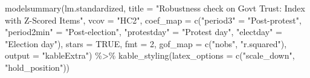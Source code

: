 \documentclass[
  letterpaper,
  DIV=11,
  numbers=noendperiod]{scrartcl}
\newenvironment{Shaded}{\begin{snugshade}}{\end{snugshade}}
\newcommand{\AttributeTok}[1]{\textcolor[rgb]{0.40,0.45,0.13}{#1}}
\newcommand{\ConstantTok}[1]{\textcolor[rgb]{0.56,0.35,0.01}{#1}}
\newcommand{\DecValTok}[1]{\textcolor[rgb]{0.68,0.00,0.00}{#1}}
\newcommand{\FunctionTok}[1]{\textcolor[rgb]{0.28,0.35,0.67}{#1}}
\newcommand{\NormalTok}[1]{\textcolor[rgb]{0.00,0.23,0.31}{#1}}
\newcommand{\OtherTok}[1]{\textcolor[rgb]{0.00,0.23,0.31}{#1}}
\newcommand{\SpecialCharTok}[1]{\textcolor[rgb]{0.37,0.37,0.37}{#1}}
\newcommand{\StringTok}[1]{\textcolor[rgb]{0.13,0.47,0.30}{#1}}
\begin{document}
\begin{Shaded}
\begin{Highlighting}[]
\FunctionTok{modelsummary}\NormalTok{(lm.standardized,}
             \AttributeTok{title =} \StringTok{"Robustness check on Gov\textquotesingle{}t Trust: Index with Z{-}Scored Items"}\NormalTok{,}
             \AttributeTok{vcov =} \StringTok{"HC2"}\NormalTok{,}
             \AttributeTok{coef\_map =} \FunctionTok{c}\NormalTok{(}\StringTok{"period3"} \OtherTok{=} \StringTok{"Post{-}protest"}\NormalTok{, }
             \StringTok{"period2min"} \OtherTok{=} \StringTok{"Post{-}election"}\NormalTok{, }\StringTok{"protestday"} \OtherTok{=} \StringTok{"Protest day"}\NormalTok{, }
             \StringTok{"electday"} \OtherTok{=} \StringTok{"Election day"}\NormalTok{),}
             \AttributeTok{stars =} \ConstantTok{TRUE}\NormalTok{, }\AttributeTok{fmt =} \DecValTok{2}\NormalTok{, }\AttributeTok{gof\_map =} \FunctionTok{c}\NormalTok{(}\StringTok{"nobs"}\NormalTok{, }\StringTok{"r.squared"}\NormalTok{),}
             \AttributeTok{output =} \StringTok{"kableExtra"}\NormalTok{) }\SpecialCharTok{\%\textgreater{}\%} 
   \FunctionTok{kable\_styling}\NormalTok{(}\AttributeTok{latex\_options =} \FunctionTok{c}\NormalTok{(}\StringTok{"scale\_down"}\NormalTok{, }\StringTok{"hold\_position"}\NormalTok{))}
\end{Highlighting}
\end{Shaded}

\begin{table}[!h]
\centering\centering
\caption{\label{tab:unnamed-chunk-14}Robustness check on Gov't Trust: Index with Z-Scored Items}
\centering
{}
\end{table}
\end{document}
